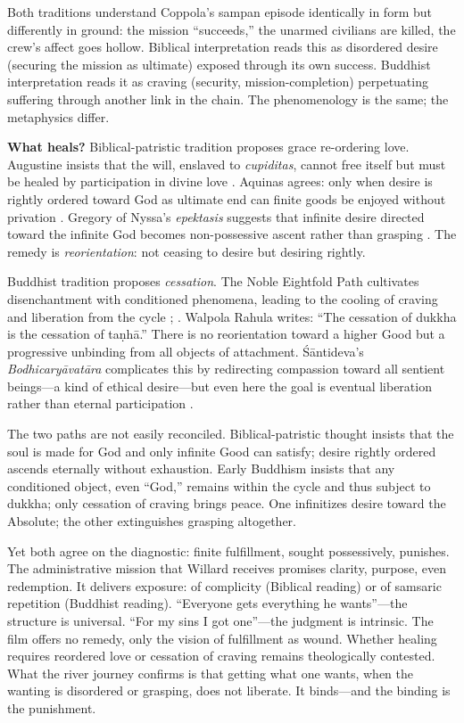 Both traditions understand Coppola's sampan episode identically in form but differently in
ground: the mission ``succeeds,'' the unarmed civilians are killed, the crew's affect goes
hollow. Biblical interpretation reads this as disordered desire (securing the mission as
ultimate) exposed through its own success. Buddhist interpretation reads it as craving
(security, mission-completion) perpetuating suffering through another link in the chain. The
phenomenology is the same; the metaphysics differ.

\textbf{What heals?} Biblical-patristic tradition proposes grace re-ordering love. Augustine
insists that the will, enslaved to \emph{cupiditas}, cannot free itself but must be healed by
participation in divine love . Aquinas agrees: only when desire
is rightly ordered toward God as ultimate end can finite goods be enjoyed without privation
. Gregory of Nyssa's \emph{epektasis} suggests that infinite desire
directed toward the infinite God becomes non-possessive ascent rather than grasping
. The remedy is \emph{reorientation}: not ceasing to desire but
desiring rightly.

Buddhist tradition proposes \emph{cessation}. The Noble Eightfold Path cultivates
disenchantment with conditioned phenomena, leading to the cooling of craving and liberation
from the cycle \parencite{Rahula1959}; \parencite{Gethin1998}. Walpola Rahula writes: ``The
cessation of dukkha is the cessation of taṇhā.'' There is no reorientation toward a higher
Good but a progressive unbinding from all objects of attachment. Śāntideva's
\emph{Bodhicaryāvatāra} complicates this by redirecting compassion toward all sentient
beings---a kind of ethical desire---but even here the goal is eventual liberation rather than
eternal participation \parencite{SantidevaBCA1995}.

The two paths are not easily reconciled. Biblical-patristic thought insists that the soul is
made for God and only infinite Good can satisfy; desire rightly ordered ascends eternally
without exhaustion. Early Buddhism insists that any conditioned object, even ``God,'' remains
within the cycle and thus subject to dukkha; only cessation of craving brings peace. One
infinitizes desire toward the Absolute; the other extinguishes grasping altogether.

Yet both agree on the diagnostic: finite fulfillment, sought possessively, punishes. The
administrative mission that Willard receives promises clarity, purpose, even redemption. It
delivers exposure: of complicity (Biblical reading) or of samsaric repetition (Buddhist
reading). ``Everyone gets everything he wants''---the structure is universal. ``For my sins I
got one''---the judgment is intrinsic. The film offers no remedy, only the vision of
fulfillment as wound. Whether healing requires reordered love or cessation of craving remains
theologically contested. What the river journey confirms is that getting what one wants, when
the wanting is disordered or grasping, does not liberate. It binds---and the binding is the
punishment.
